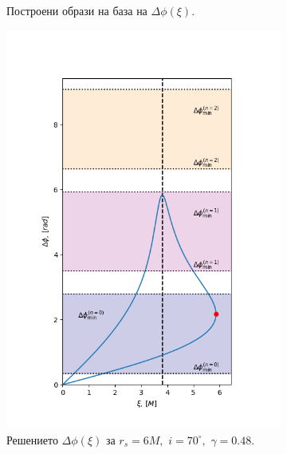 \begin{figure}[!htb]
\begin{subfigure}{6cm}
		\caption{Построени образи на база на  $\Delta\phi(\xi)$.} 
	\end{subfigure}
	\begin{subfigure}{6cm}
		\hspace{0.8cm}
		\includegraphics[scale = 0.32]{JNW_70_deg_r6_gamma_0.48_impact.png}
		\caption{Решението $\Delta\phi(\xi)$ за $r_s = 6M,\,\, i = 70^\circ,\,\,\gamma = 0.48$.} 
	\end{subfigure}\,\,\,
	\begin{subfigure}{6cm}
		\hspace{-0.5cm}

\end{subfigure}
\end{figure}
